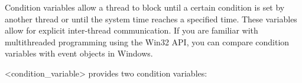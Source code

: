 
Condition variables allow a thread to block until a certain condition is set by another thread or until the system time reaches a specified time. These variables allow for explicit inter-thread communication. If you are familiar with multithreaded programming using the Win32 API, you can compare condition variables with event objects in Windows.

<condition\_variable> provides two condition variables:





